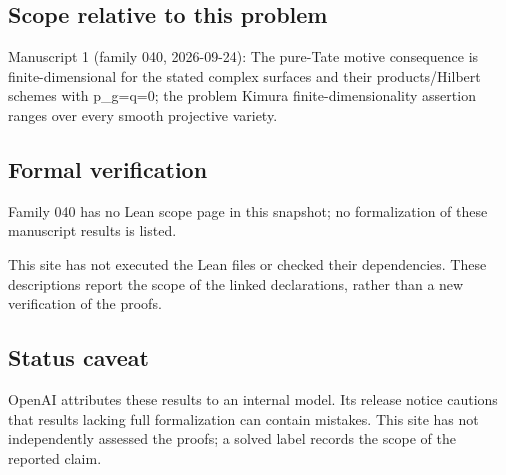 \documentclass[11pt]{article}
\begin{document}
\subsection{Scope relative to this problem}
Manuscript 1 (family 040, 2026-09-24): The pure-Tate motive consequence is finite-dimensional for the stated complex surfaces and their products/Hilbert schemes with p\_g=q=0; the problem Kimura finite-dimensionality assertion ranges over every smooth projective variety.

\subsection{Formal verification}
Family 040 has no Lean scope page in this snapshot; no formalization of these manuscript results is listed.

This site has not executed the Lean files or checked their dependencies. These descriptions report the scope of the linked declarations, rather than a new verification of the proofs.

\subsection{Status caveat}
OpenAI attributes these results to an internal model. Its release notice cautions that results lacking full formalization can contain mistakes. This site has not independently assessed the proofs; a solved label records the scope of the reported claim.
\end{document}
